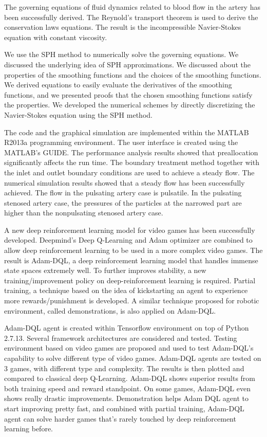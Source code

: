        The governing equations of fluid dynamics related to blood flow in the artery has been successfully derived. The Reynold's transport theorem is used to derive the conservation laws equations. The result is the incompressible Navier-Stokes equation with constant viscosity. \par
	    We use the SPH method to numerically solve the governing equations. We discussed the underlying idea of SPH approximations. We discussed about the properties of the smoothing functions and the choices of the smoothing functions. We derived equations to easily evaluate the derivatives of the smoothing functions, and we presented proofs that the chosen smoothing functions satisfy the properties. We developed the numerical schemes by directly discretizing the Navier-Stokes equation using the SPH method. \par
	    The code and the graphical simulation are implemented within the MATLAB R2013a programming environment. The user interface is created using the MATLAB's GUIDE. The performance analysis results showed that preallocation significantly affects the run time. The boundary treatment method together with the inlet and outlet boundary conditions are used to achieve a steady flow. The numerical simulation results showed that a steady flow has been successfully achieved. The flow in the pulsating artery case is pulsatile. In the pulsating stenosed artery case, the pressures of the particles at the narrowed part are higher than the nonpulsating stenosed artery case. 
        \fi
        
        A new deep reinforcement learning model for video games has been successfully developed. Deepmind's Deep Q-Learning and Adam optimizer are combined to allow deep reinforcement learning to be used in a more complex video games. The result is Adam-DQL, a deep reinforcement learning model that handles immense state spaces extremely well. To further improves stability, a new training/improvement policy on deep-reinforcement learning is required. Partial training, a technique based on the idea of kickstarting an agent to experience more rewards/punishment is developed. A similar technique proposed for robotic environment, called demonstrations, is also applied on Adam-DQL. 
        \par
        Adam-DQL agent is created within Tensorflow environment on top of Python 2.7.13. Several framework architectures are considered and tested. Testing environment based on video games are proposed and used to test Adam-DQL's capability to solve different type of video games. Adam-DQL agents are tested on 3 games, with different type and complexity. The results is then plotted and compared to classical deep Q-Learning. Adam-DQL shows superior results from both training speed and reward standpoint. On some games, Adam-DQL even shows really drastic improvements. Demonstration helps Adam DQL agent to start improving pretty fast, and combined with partial training, Adam-DQL agent can solve harder games that's rarely touched by deep reinforcement learning before.   
